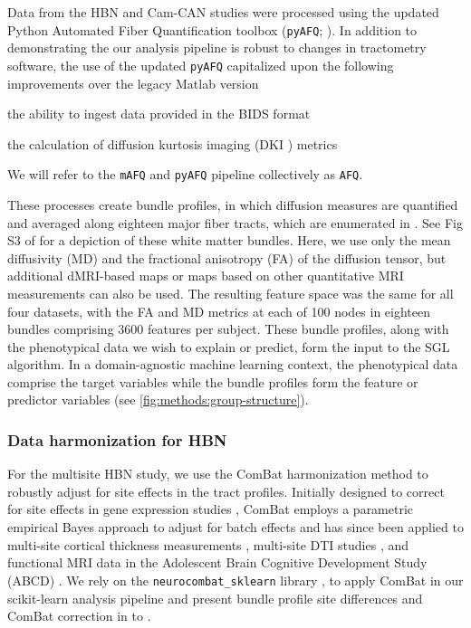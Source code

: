 \documentclass[10pt,letterpaper]{article}
\begin{document}
Data from the HBN and Cam-CAN studies were processed using the updated Python
Automated Fiber Quantification toolbox (\texttt{pyAFQ}; \cite{kruper2021evaluating}). In
addition to demonstrating the our analysis pipeline is robust to changes in
tractometry software, the use of the updated \texttt{pyAFQ} capitalized upon
the following improvements over the legacy Matlab version
\begin{enumerate*}[%
    label=(\roman*),%
    before=\unskip{: },%
    itemjoin={{, }},%
    itemjoin*={{, and }}]
    \item the ability to ingest data provided in the BIDS format
    \cite{gorgolewski2016brain}
    \item the calculation of diffusion kurtosis imaging (DKI
    \cite{jensen2005diffusion}) metrics
\end{enumerate*}
We will refer to the \texttt{mAFQ} and \texttt{pyAFQ} pipeline collectively
as \texttt{AFQ}.

These processes create bundle profiles, in which diffusion measures
are quantified and averaged along eighteen major fiber tracts,
which are enumerated in .
See Fig S3 of \cite{kruper2021evaluating} for a depiction of these white matter bundles.
Here,
we use only the mean diffusivity (MD) and the fractional anisotropy
(FA) of the diffusion tensor, but additional dMRI-based maps or maps
based on other quantitative MRI measurements can also be used.
The resulting feature space was the same for all four datasets, with the FA and MD metrics at each of 100 nodes in eighteen bundles comprising 3600 features per subject.
These bundle profiles, along with the phenotypical data we wish to explain
or predict, form the input to the SGL algorithm. In a domain-agnostic
machine learning context, the phenotypical data comprise the target
variables while the bundle profiles form the feature or predictor
variables (see \cref{fig:methods:group-structure}).

\subsubsection*{Data harmonization for HBN}

For the multisite HBN study, we use the ComBat harmonization method to robustly adjust for site effects in the tract profiles. Initially designed to correct for site effects in gene expression studies \cite{johnson2007adjusting}, ComBat employs a parametric empirical Bayes approach to adjust for batch effects and has since been applied to multi-site cortical thickness measurements \cite{fortin2018harmonization}, multi-site DTI studies \cite{fortin2017harmonization}, and functional MRI data in the Adolescent Brain Cognitive Development Study (ABCD) \cite{nielson2018detecting}. We rely on the \texttt{neurocombat\_sklearn} library \cite{neurocombat_sklearn}, to apply ComBat in our scikit-learn analysis pipeline and present bundle profile site differences and ComBat correction in  to .
\end{document}
